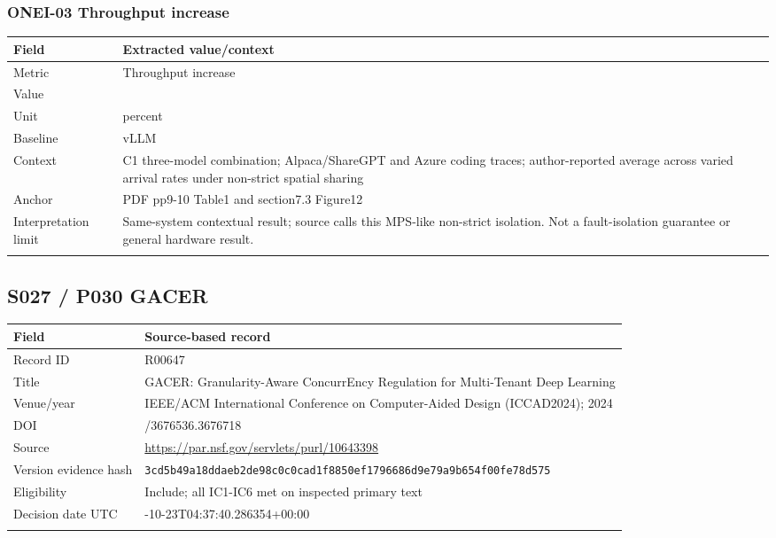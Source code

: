 \subsubsection*{ONEI-03 Throughput increase}
\begin{longtable}{>{\raggedright\arraybackslash}p{}>{\raggedright\arraybackslash}p{}}
\toprule
\textbf{Field} & \textbf{Extracted value/context}\\\midrule\endhead
Metric & Throughput increase\\\addlinespace
Value & 6.6\\\addlinespace
Unit & percent\\\addlinespace
Baseline & vLLM\\\addlinespace
Context & C1 three-model combination;\allowbreak{} Alpaca/ShareGPT and Azure coding traces;\allowbreak{} author-reported average across varied arrival rates under non-strict spatial sharing\\\addlinespace
Anchor & PDF pp9-10 Table1 and section7.3 Figure12\\\addlinespace
Interpretation limit & Same-system contextual result;\allowbreak{} source calls this MPS-like non-strict isolation. Not a fault-isolation guarantee or general hardware result.\\\addlinespace
\bottomrule\end{longtable}
\clearpage\subsection{S027 / P030 GACER}
\cite{s027}
\begin{longtable}{>{\raggedright\arraybackslash}p{}>{\raggedright\arraybackslash}p{}}
\toprule
\textbf{Field} & \textbf{Source-based record}\\\midrule\endhead
Record ID & R00647\\\addlinespace
Title & GACER: Granularity-Aware ConcurrEncy Regulation for Multi-Tenant Deep Learning\\\addlinespace
Venue/year & IEEE/ACM International Conference on Computer-Aided Design (ICCAD2024);\allowbreak{} 2024\\\addlinespace
DOI & 10.1145/3676536.3676718\\\addlinespace
Source & \url{https://par.nsf.gov/servlets/purl/10643398}\\\addlinespace
Version evidence hash & \nolinkurl{3cd5b49a18ddaeb2de98c0c0cad1f8850ef1796686d9e79a9b654f00fe78d575}\\\addlinespace
Eligibility & Include;\allowbreak{} all IC1-IC6 met on inspected primary text\\\addlinespace
Decision date UTC & 2026-10-23T04:37:40.286354+00:00\\\addlinespace
\bottomrule\end{longtable}
